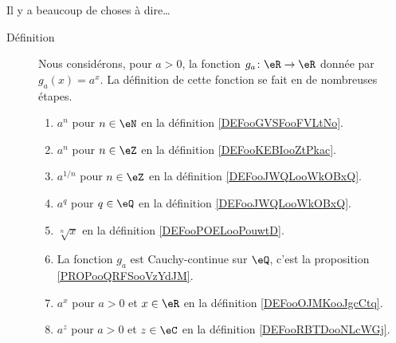 
      \label{THEMEooBSBLooWcaQnR}

Il y a beaucoup de choses à dire\ldots

\begin{description}
	\item[Définition]
	      Nous considérons, pour \( a>0\), la fonction \( g_a\colon \eR\to \eR\) donnée par \( g_a(x)=a^x\). La définition de cette fonction se fait en de nombreuses étapes.
	      \begin{enumerate}
		      \item
		            \( a^n\) pour \( n\in \eN\) en la définition \ref{DEFooGVSFooFVLtNo}.
		      \item
		            \( a^n\) pour \( n\in \eZ\) en la définition \ref{DEFooKEBIooZtPkac}.
		      \item
		            \( a^{1/n}\) pour \( n\in \eZ\) en la définition \ref{DEFooJWQLooWkOBxQ}.
		      \item
		            \( a^q\) pour \( q\in \eQ\) en la définition \ref{DEFooJWQLooWkOBxQ}.
		      \item
		            \( \sqrt[n]{ x }\) en la définition \ref{DEFooPOELooPouwtD}.
		      \item
		            La fonction \( g_a\) est Cauchy-continue sur \( \eQ\), c'est la proposition \ref{PROPooQRFSooVzYdJM}.
		      \item
		            \( a^x\) pour \( a>0\) et \( x\in \eR\) en la définition \ref{DEFooOJMKooJgcCtq}.
		      \item
		            \( a^z\) pour \( a>0\) et \( z\in \eC\) en la définition \ref{DEFooRBTDooNLcWGj}.
	      \end{enumerate}


\end{description}
